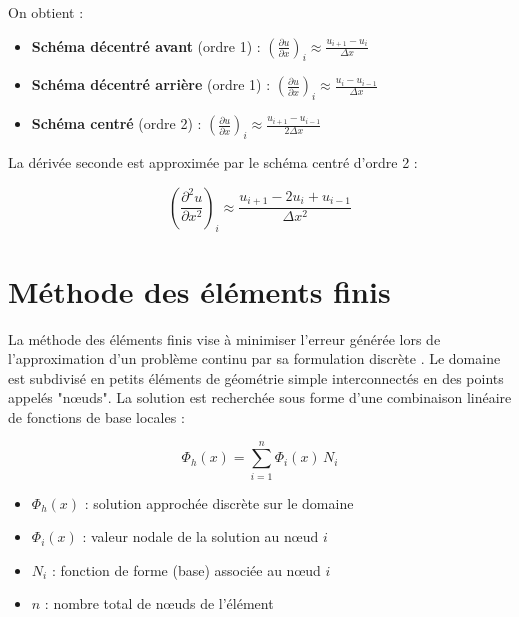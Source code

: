 On obtient :
\begin{itemize}
    \item \textbf{Schéma décentré avant} (ordre 1) : \( \left( \frac{\partial u}{\partial x} \right)_i \approx \frac{u_{i+1} - u_i}{\Delta x} \)
    \item \textbf{Schéma décentré arrière} (ordre 1) : \( \left( \frac{\partial u}{\partial x} \right)_i \approx \frac{u_i - u_{i-1}}{\Delta x} \)
    \item \textbf{Schéma centré} (ordre 2) : \( \left( \frac{\partial u}{\partial x} \right)_i \approx \frac{u_{i+1} - u_{i-1}}{2\Delta x} \)
\end{itemize}

La dérivée seconde est approximée par le schéma centré d'ordre 2 \cite{strikwerda2004finite} :

\begin{equation}
\left( \frac{\partial^2 u}{\partial x^2} \right)_i \approx \frac{u_{i+1} - 2u_i + u_{i-1}}{\Delta x^2}
\label{eq:derivee_seconde}
\end{equation}

\section{Méthode des éléments finis}
\label{sec:elements_finis}

La méthode des éléments finis vise à minimiser l'erreur générée lors de l'approximation d'un problème continu par sa formulation discrète \cite{zienkiewicz2013finite}. Le domaine est subdivisé en petits éléments de géométrie simple interconnectés en des points appelés "nœuds". La solution est recherchée sous forme d'une combinaison linéaire de fonctions de base locales \cite{reddy2006introduction} :

\begin{equation}
\Phi_h(x) = \sum_{i=1}^{n} \Phi_i(x)\, N_i
\label{eq:elements_finis}
\end{equation}

\begin{itemize}
    \item[--] \(\Phi_h(x)\) : solution approchée discrète sur le domaine
    \item[--] \(\Phi_i(x)\) : valeur nodale de la solution au n\oe ud \(i\)
    \item[--] \(N_i\) : fonction de forme (base) associée au n\oe ud \(i\)
    \item[--] \(n\) : nombre total de n\oe uds de l'élément
\end{itemize}

